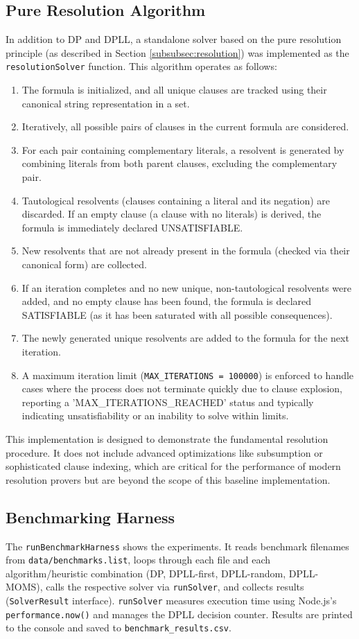 \documentclass[12pt, a4paper]{article}
\begin{document}
\subsection{Pure Resolution Algorithm}
\label{subsec:pure_resolution_impl}
In addition to DP and DPLL, a standalone solver based on the pure resolution principle (as described in Section \ref{subsubsec:resolution}) was implemented as the \texttt{resolutionSolver} function. This algorithm operates as follows:
\begin{enumerate}
    \item The formula is initialized, and all unique clauses are tracked using their canonical string representation in a set.
    \item Iteratively, all possible pairs of clauses in the current formula are considered.
    \item For each pair containing complementary literals, a resolvent is generated by combining literals from both parent clauses, excluding the complementary pair.
    \item Tautological resolvents (clauses containing a literal and its negation) are discarded. If an empty clause (a clause with no literals) is derived, the formula is immediately declared UNSATISFIABLE.
    \item New resolvents that are not already present in the formula (checked via their canonical form) are collected.
    \item If an iteration completes and no new unique, non-tautological resolvents were added, and no empty clause has been found, the formula is declared SATISFIABLE (as it has been saturated with all possible consequences).
    \item The newly generated unique resolvents are added to the formula for the next iteration.
    \item A maximum iteration limit (\texttt{MAX\_ITERATIONS = 100000}) is enforced to handle cases where the process does not terminate quickly due to clause explosion, reporting a 'MAX\_ITERATIONS\_REACHED' status and typically indicating unsatisfiability or an inability to solve within limits.
\end{enumerate}
This implementation is designed to demonstrate the fundamental resolution procedure. It does not include advanced optimizations like subsumption or sophisticated clause indexing, which are critical for the performance of modern resolution provers but are beyond the scope of this baseline implementation.

\subsection{Benchmarking Harness}
The \texttt{runBenchmarkHarness} shows the experiments. It reads benchmark filenames from \texttt{data/benchmarks.list}, loops through each file and each algorithm/heuristic combination (DP, DPLL-first, DPLL-random, DPLL-MOMS), calls the respective solver via \texttt{runSolver}, and collects results (\texttt{SolverResult} interface). \texttt{runSolver} measures execution time using Node.js's \texttt{performance.now()} and manages the DPLL decision counter. Results are printed to the console and saved to \texttt{benchmark\_results.csv}.
\end{document}
